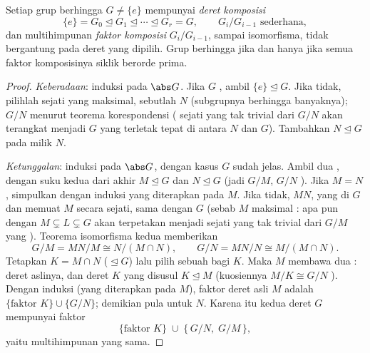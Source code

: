\begin{theorem}\label{thm:b3:groups:jordanholder}
Setiap grup berhingga $G \neq \{e\}$ mempunyai \emph{deret
komposisi}
\[
\{e\} = G_0 \trianglelefteq G_1 \trianglelefteq \cdots
\trianglelefteq G_r = G,
\qquad G_{i}/G_{i-1} \text{ sederhana},
\]
dan multihimpunan \emph{faktor komposisi} $G_i/G_{i-1}$, sampai
isomorfisma, tidak bergantung pada deret yang dipilih. Grup
berhingga  jika dan hanya jika semua faktor komposisinya siklik
berorde prima.
\end{theorem}

\begin{proof}
\emph{Keberadaan}: induksi pada $\abs G$. Jika $G$ , ambil
$\{e\} \trianglelefteq G$. Jika tidak, pilihlah  sejati yang
maksimal, sebutlah $N$ (subgrupnya berhingga banyaknya); $G/N$ 
menurut teorema korespondensi ( sejati yang tak trivial
dari $G/N$ akan terangkat menjadi  $G$ yang terletak tepat di antara
$N$ dan $G$). Tambahkan $N \trianglelefteq G$ pada 
milik $N$.

\emph{Ketunggalan}: induksi pada $\abs G$, dengan kasus $G$ 
sudah jelas. Ambil dua , dengan suku kedua dari akhir
$M \trianglelefteq G$ dan $N \trianglelefteq G$ (jadi $G/M$, $G/N$
). Jika $M = N$, simpulkan dengan induksi yang diterapkan pada $M$.
Jika tidak, $MN$, yang  di $G$ dan memuat $M$ secara sejati, sama dengan
$G$ (sebab $M$ maksimal :  apa pun dengan $M \subsetneq L
\subsetneq G$ akan terpetakan menjadi  sejati yang tak trivial dari
$G/M$ yang ). Teorema isomorfisma kedua memberikan
\[
G/M = MN/M \cong N/(M \cap N),
\qquad
G/N = MN/N \cong M/(M \cap N).
\]
Tetapkan $K = M \cap N$ ($\trianglelefteq G$) lalu pilih sebuah  bagi $K$. Maka $M$ membawa dua : deret
aslinya, dan deret $K$ yang disusul $K \trianglelefteq
M$ (kuosiennya $M/K \cong G/N$ ). Dengan induksi (yang diterapkan
pada $M$), faktor deret asli $M$ adalah
$\{\text{faktor } K\} \cup \{G/N\}$; demikian pula untuk $N$. Karena itu
kedua deret $G$ mempunyai faktor
\[
\{\text{faktor } K\} \;\cup\; \{\,G/N,\; G/M\,\},
\]
yaitu multihimpunan yang sama.


\end{proof}
